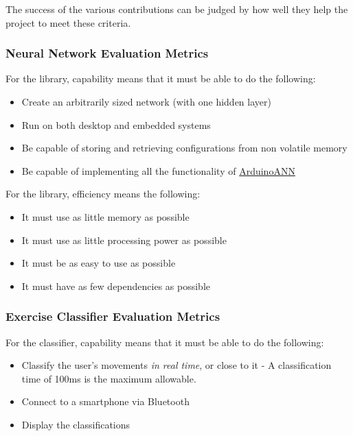 \documentclass[a4paper]{article}
\begin{document}
The success of the various contributions can be judged by how well they help the project to meet these criteria.

\subsubsection{Neural Network Evaluation Metrics}
\label{subsubsec:in_cs_nnmetrics}

For the library, capability means that it must be able to do the following:

\begin{itemize}
\item Create an arbitrarily sized network (with one hidden layer)
\item Run on both desktop and embedded systems
\item Be capable of storing and retrieving configurations from non volatile memory
\item Be capable of implementing all the functionality of \hyperref[subsec:bg_arduinoann]{ArduinoANN}
\end{itemize}

For the library, efficiency means the following:
\begin{itemize}
\item It must use as little memory as possible
\item It must use as little processing power as possible
\item It must be as easy to use as possible
\item It must have as few dependencies as possible
\end{itemize}

\subsubsection{Exercise Classifier Evaluation Metrics}
\label{subsubsec:in_cs_ecmetrics}

For the classifier, capability means that it must be able to do the following:

\begin{itemize}
\item Classify the user's movements \textit{in real time}, or close to it - A classification time of 100ms is the maximum allowable.
\item Connect to a smartphone via Bluetooth
\item Display the classifications
\end{itemize}
\end{document}
